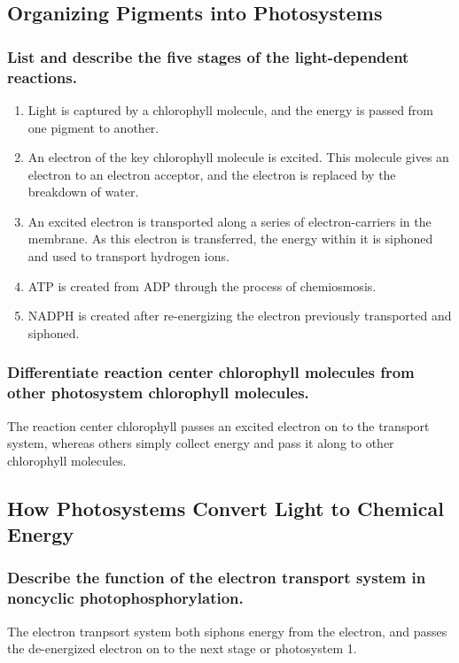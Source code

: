\documentclass[a4paper]{article}
\begin{document}
\subsection{Organizing Pigments into Photosystems}
\subsubsection{List and describe the five stages of the light-dependent reactions.}
\begin{enumerate}
    \item  Light is captured by a chlorophyll molecule, and the energy is passed from one pigment
            to another.
    \item  An electron of the key chlorophyll molecule is excited. This molecule gives an 
            electron to an electron acceptor, and the electron is replaced by the breakdown of water.
    \item  An excited electron is transported along a series of electron-carriers in the membrane.
            As this electron is transferred, the energy within it is siphoned and used to transport
            hydrogen ions.
    \item  ATP is created from ADP through the process of chemiosmosis. 
    \item  NADPH is created after re-energizing the electron previously transported and siphoned.
\end{enumerate}

\subsubsection{Differentiate reaction center chlorophyll molecules from other photosystem
chlorophyll molecules.}
The reaction center chlorophyll passes an excited electron on to the transport system,
whereas others simply collect energy and pass it along to other chlorophyll molecules.

\subsection{How Photosystems Convert Light to Chemical Energy}
\subsubsection{Describe the function of the electron transport system in noncyclic 
photophosphorylation.}
The electron tranpsort system both siphons energy from the electron, and passes the de-energized
electron on to the next stage or photosystem 1.
\end{document}
